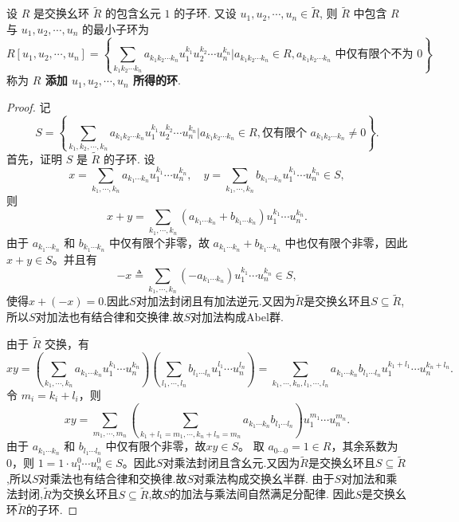 \documentclass[../../main.tex]{subfiles}%
\begin{document}
\begin{theorem}
设 \( R \) 是交换幺环 \( \widetilde{R} \) 的包含幺元 \( 1 \) 的子环. 又设 \( u_1, u_2, \cdots, u_n \in \widetilde{R} \), 则 \( \widetilde{R} \) 中包含 \( R \) 与 \( u_1, u_2, \cdots, u_n \) 的最小子环为
\[
R[u_1, u_2, \cdots, u_n] = \left\{ \sum_{k_1 k_2 \cdots k_n} a_{k_1 k_2 \cdots k_n} u_1^{k_1} u_2^{k_2} \cdots u_n^{k_n} \bigg| a_{k_1 k_2 \cdots k_n} \in R, a_{k_1 k_2 \cdots k_n} \text{ 中仅有限个不为 } 0 \right\}
\]
称为 \textbf{\( R \) 添加 \( u_1, u_2, \cdots, u_n \) 所得的环}.
\end{theorem}
\begin{proof}
记
\[
S  = \left\{ \sum_{k_1, k_2, \cdots, k_n} a_{k_1 k_2 \cdots k_n} u_1^{k_1} u_2^{k_2} \cdots u_n^{k_n} \bigg| a_{k_1 k_2 \cdots k_n} \in R, \text{仅有限个 } a_{k_1 k_2 \cdots k_n} \neq 0 \right\}.
\]
首先，证明 \( S \) 是 \( \widetilde{R} \) 的子环.
设
\[
x = \sum_{k_1, \cdots, k_n} a_{k_1 \cdots k_n} u_1^{k_1} \cdots u_n^{k_n}, \quad y = \sum_{k_1, \cdots, k_n} b_{k_1 \cdots k_n} u_1^{k_1} \cdots u_n^{k_n} \in S,
\]
则
\[
x + y = \sum_{k_1, \cdots, k_n} (a_{k_1 \cdots k_n} + b_{k_1 \cdots k_n}) u_1^{k_1} \cdots u_n^{k_n}.
\]
由于 \( a_{k_1 \cdots k_n} \) 和 \( b_{k_1 \cdots k_n} \) 中仅有限个非零，故 \( a_{k_1 \cdots k_n} + b_{k_1 \cdots k_n} \) 中也仅有限个非零，因此 \( x + y \in S \)。并且有
\[
-x \triangleq  \sum_{k_1, \cdots, k_n}(-a_{k_1 \cdots k_n}) u_1^{k_1} \cdots u_n^{k_n} \in S,
\]
使得$x+(-x)=0.$因此$S$对加法封闭且有加法逆元.又因为$\widetilde{R}$是交换幺环且$S\subseteq \widetilde{R}$,所以$S$对加法也有结合律和交换律.故$S$对加法构成Abel群.

由于 \( \widetilde{R} \) 交换，有
\[
xy = \left( \sum_{k_1, \cdots, k_n} a_{k_1 \cdots k_n} u_1^{k_1} \cdots u_n^{k_n} \right) \left( \sum_{l_1, \cdots, l_n} b_{l_1 \cdots l_n} u_1^{l_1} \cdots u_n^{l_n} \right)
= \sum_{k_1, \cdots, k_n, l_1, \cdots, l_n} a_{k_1 \cdots k_n} b_{l_1 \cdots l_n} u_1^{k_1 + l_1} \cdots u_n^{k_n + l_n}.
\]
令 \( m_i = k_i + l_i \)，则
\[
xy = \sum_{m_1, \cdots, m_n} \left( \sum_{k_1 + l_1 = m_1, \cdots, k_n + l_n = m_n} a_{k_1 \cdots k_n} b_{l_1 \cdots l_n} \right) u_1^{m_1} \cdots u_n^{m_n}.
\]
由于 \( a_{k_1 \cdots k_n} \) 和 \( b_{l_1 \cdots l_n} \) 中仅有限个非零，故\( xy \in S \)。
取 \( a_{0 \cdots 0} = 1 \in R \)，其余系数为 0，则 \( 1 = 1 \cdot u_1^0 \cdots u_n^0 \in S \)。因此$S$对乘法封闭且含幺元.又因为$\widetilde{R}$是交换幺环且$S\subseteq \widetilde{R}$,所以$S$对乘法也有结合律和交换律.故$S$对乘法构成交换幺半群.
由于$S$对加法和乘法封闭,$\widetilde{R}$为交换幺环且$S\subseteq \widetilde{R}$,故$S$的加法与乘法间自然满足分配律.
因此$S$是交换幺环$\widetilde{R}$的子环.


\end{proof}
\end{document}
